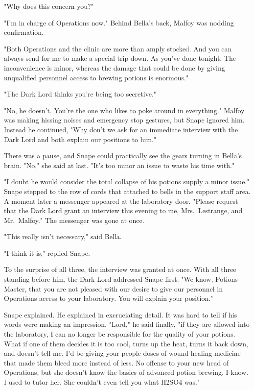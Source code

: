 "Why does this concern you?"

"I'm in charge of Operations now." Behind Bella's back, Malfoy was nodding confirmation.

"Both Operations and the clinic are more than amply stocked. And you can always send for me to make a special trip down. As you've done tonight. The inconvenience is minor, whereas the damage that could be done by giving unqualified personnel access to brewing potions is enormous."

"The Dark Lord thinks you're being too secretive."

"No, he doesn't. You're the one who likes to poke around in everything." Malfoy was making hissing noises and emergency stop gestures, but Snape ignored him. Instead he continued, "Why don't we ask for an immediate interview with the Dark Lord and both explain our positions to him."

There was a pause, and Snape could practically see the gears turning in Bella's brain. "No," she said at last. "It's too minor an issue to waste his time with."

"I doubt he would consider the total collapse of his potions supply a minor issue." Snape stepped to the row of cords that attached to bells in the support staff area. A moment later a messenger appeared at the laboratory door. "Please request that the Dark Lord grant an interview this evening to me, Mrs.~Lestrange, and Mr.~Malfoy." The messenger was gone at once.

"This really isn't necessary," said Bella.

"I think it is," replied Snape.

To the surprise of all three, the interview was granted at once. With all three standing before him, the Dark Lord addressed Snape first. "We know, Potions Master, that you are not pleased with our desire to give our personnel in Operations access to your laboratory. You will explain your position."

Snape explained. He explained in excruciating detail. It was hard to tell if his words were making an impression. "Lord," he said finally, "if they are allowed into the laboratory, I can no longer be responsible for the quality of your potions. What if one of them decides it is too cool, turns up the heat, turns it back down, and doesn't tell me. I'd be giving your people doses of wound healing medicine that made them bleed more instead of less. No offense to your new head of Operations, but she doesn't know the basics of advanced potion brewing. I know. I used to tutor her. She couldn't even tell you what H2SO4 was."

